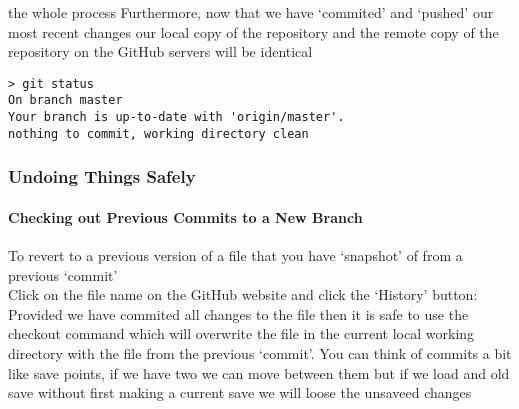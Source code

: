 \documentclass[xcolor=dvipsnames]{beamer}
\begin{document}
\begin{frame}[fragile]
\begin{block}{the whole process}
Furthermore, now that we have `commited' and `pushed' our most recent changes our local copy of the repository and the remote copy of the repository on the GitHub servers will be identical
\begin{lstlisting}
> git status
On branch master
Your branch is up-to-date with 'origin/master'.
nothing to commit, working directory clean
\end{lstlisting}
\end{block}
\end{frame}



\begin{frame} 
\frametitle{Undoing Things Safely}
\framesubtitle{Checking out Previous Commits to a New Branch}
To revert to a previous version of a file that you have `snapshot' of from a previous `commit'\\
Click on the file name on the GitHub website and click the `History' button:
\newline
\newline
Provided we have commited all changes to the file then it is safe to use the checkout command which will overwrite the file in the current local working directory with the file from the previous `commit'.
\newline
\newline
You can think of commits a bit like save points, if we have two we can move between them but if we load and old save without first making a current save we will loose the unsaveed changes
\end{frame}
\end{document}
